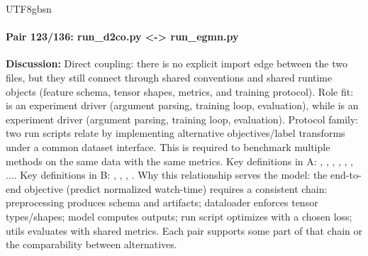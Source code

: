 \documentclass[11pt]{article}
\begin{document}
\begin{CJK*}{UTF8}{gbsn}
\paragraph{Pair 123/136: run\_d2co.py <-> run\_egmn.py}
\textbf{Discussion:} Direct coupling: there is no explicit import edge between the two files, but they still connect through shared conventions and shared runtime objects (feature schema, tensor shapes, metrics, and training protocol). Role fit: \texttt{} is an experiment driver (argument parsing, training loop, evaluation), while \texttt{} is an experiment driver (argument parsing, training loop, evaluation). Protocol family: two run scripts relate by implementing alternative objectives/label transforms under a common dataset interface. This is required to benchmark multiple methods on the same data with the same metrics. Key definitions in A: \texttt{}, \texttt{}, \texttt{}, \texttt{}, \texttt{}, \texttt{}, .... Key definitions in B: \texttt{}, \texttt{}, \texttt{}, \texttt{}. Why this relationship serves the model: the end-to-end objective (predict normalized watch-time) requires a consistent chain: preprocessing produces schema and artifacts; dataloader enforces tensor types/shapes; model computes outputs; run script optimizes with a chosen loss; utils evaluates with shared metrics. Each pair supports some part of that chain or the comparability between alternatives.


\end{CJK*}
\end{document}
